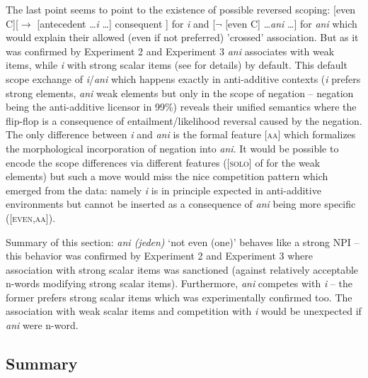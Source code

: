 \documentclass[output=paper,
]{langscibook}
\begin{document}
\noindent The last point seems to point to the existence of possible reversed scoping: [even C][$\rightarrow$ [antecedent \ldots \textit{i} \ldots] consequent ] for \textit{i} and  [$\neg$ [even C] \ldots \textit{ani} \ldots] for \textit{ani} which would explain their allowed (even if not preferred) 'crossed' association. But as it was confirmed by Experiment 2 and Experiment 3 \textit{ani} associates with weak items, while \textit{i} with strong scalar items (see \citealt{docekalsafratovaoli} for details) by default. This default scope exchange of \textit{i}/\textit{ani} which happens exactly in anti-additive contexts (\textit{i} prefers strong elements, \textit{ani} weak elements but only in the scope of negation -- negation being the anti-additive licensor in 99\%) reveals their unified semantics where the flip-flop is a consequence of entailment/likelihood reversal caused by the negation. The only difference between \textit{i} and \textit{ani} is the formal feature [\textsc{aa}] which formalizes the morphological incorporation of negation into \textit{ani}.  It would be possible to encode the scope differences via different features ([\textsc{solo}] of \citealt{crnic2011getting} for the weak elements) but such a move would miss the nice competition pattern which emerged from the data: namely \textit{i} is in principle expected in anti-additive environments but cannot be inserted as a consequence of \textit{ani} being more specific ([\textsc{even,aa}]).

Summary of this section: \textit{ani (jeden)} `not even (one)' behaves like a strong NPI -- this behavior was confirmed by Experiment 2 and Experiment 3 where association with strong scalar items was sanctioned (against relatively acceptable n-words modifying strong scalar items). Furthermore, \textit{ani} competes with \textit{i} -- the former prefers strong scalar items which was experimentally confirmed too. The association with weak scalar items and competition with \textit{i} would be unexpected if \textit{ani} were n-word.

\subsection{Summary}\label{summary}
\end{document}
